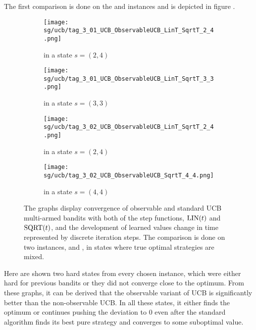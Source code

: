 \documentclass[../main.tex]{subfiles}
\begin{document}
The first comparison is done on the  and  instances and is depicted in figure .
\begin{figure}[ht]
    \begin{subfigure}[t]{0.45\linewidth}
        \texttt{[image: sg/ucb/tag\_3\_01\_UCB\_ObservableUCB\_LinT\_SqrtT\_2\_4.png]}
        \caption{ in a state $s = \left(2, 4\right)$}
        \label{apx:sgexp:succ:fig:tag301:24}
    \end{subfigure}
    \hfill
    \begin{subfigure}[t]{0.45\linewidth}
        \texttt{[image: sg/ucb/tag\_3\_01\_UCB\_ObservableUCB\_LinT\_SqrtT\_3\_3.png]}
        \caption{ in a state $s = \left(3, 3\right)$}
        \label{apx:sgexp:succ:fig:tag301:33}
    \end{subfigure}
    \begin{subfigure}[t]{0.45\linewidth}
        \texttt{[image: sg/ucb/tag\_3\_02\_UCB\_ObservableUCB\_LinT\_SqrtT\_2\_4.png]}
        \caption{ in a state $s = \left(2, 4\right)$}
        \label{apx:sgexp:succ:fig:tag302:24}
    \end{subfigure}
    \hfill
    \begin{subfigure}[t]{0.45\linewidth}
        \texttt{[image: sg/ucb/tag\_3\_02\_UCB\_ObservableUCB\_SqrtT\_4\_4.png]}
        \caption{ in a state $s = \left(4, 4\right)$}
        \label{apx:sgexp:succ:fig:tag302:44}
    \end{subfigure}
    \caption[Comparison of observable and non-observable UCB multi-armed bandits on mixed-strategy states]{
        The graphs display convergence of observable and standard UCB multi-armed bandits with both of the step functions, $\text{LIN}(t)$ and $\text{SQRT}(t)$, and the development of learned values change in time represented by discrete iteration steps.
        The comparison is done on two instances,  and , in states where true optimal strategies are mixed.
    }
    \label{apx:sgexp:ucb:fig:tags}
\end{figure}
Here are shown two hard states from every chosen instance, which were either hard for previous bandits or they did not converge close to the optimum.
From these graphs, it can be derived that the observable variant of UCB is significantly better than the non-observable UCB.
In all these states, it either finds the optimum or continues pushing the deviation to 0 even after the standard algorithm finds its best pure strategy and converges to some suboptimal value.
\end{document}
